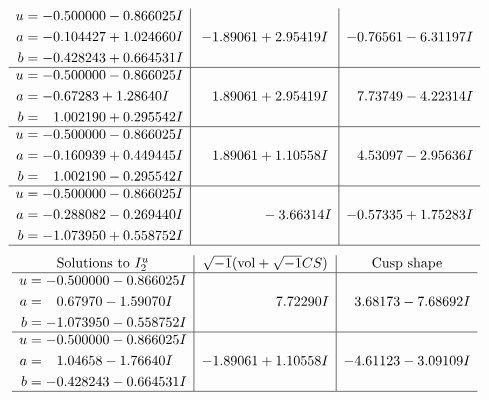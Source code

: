 \documentclass[1p]{elsarticle_modified}
\theoremstyle{definition}
\newcommand{\I}{\sqrt{-1}}
\begin{document}
$$\begin{array}{c|c|c}
\begin{aligned}
u &= -0.500000 - 0.866025 I \\
a &= -0.104427 + 1.024660 I \\
b &= -0.428243 + 0.664531 I\end{aligned}
 & -1.89061 + 2.95419 I & -0.76561 - 6.31197 I \\ \hline\begin{aligned}
u &= -0.500000 - 0.866025 I \\
a &= -0.67283 + 1.28640 I \\
b &= \phantom{-}1.002190 + 0.295542 I\end{aligned}
 & \phantom{-}1.89061 + 2.95419 I & \phantom{-}7.73749 - 4.22314 I \\ \hline\begin{aligned}
u &= -0.500000 - 0.866025 I \\
a &= -0.160939 + 0.449445 I \\
b &= \phantom{-}1.002190 - 0.295542 I\end{aligned}
 & \phantom{-}1.89061 + 1.10558 I & \phantom{-}4.53097 - 2.95636 I \\ \hline\begin{aligned}
u &= -0.500000 - 0.866025 I \\
a &= -0.288082 - 0.269440 I \\
b &= -1.073950 + 0.558752 I\end{aligned}
 & \phantom{-0.000000 } -3.66314 I & -0.57335 + 1.75283 I\\
 \hline 
 \end{array}$$\newpage$$\begin{array}{c|c|c}  
\text{Solutions to }I^u_{2}& \I (\text{vol} + \sqrt{-1}CS) & \text{Cusp shape}\\
 \hline 
\begin{aligned}
u &= -0.500000 - 0.866025 I \\
a &= \phantom{-}0.67970 - 1.59070 I \\
b &= -1.073950 - 0.558752 I\end{aligned}
 & \phantom{-0.000000 -}7.72290 I & \phantom{-}3.68173 - 7.68692 I \\ \hline\begin{aligned}
u &= -0.500000 - 0.866025 I \\
a &= \phantom{-}1.04658 - 1.76640 I \\
b &= -0.428243 - 0.664531 I\end{aligned}
 & -1.89061 + 1.10558 I & -4.61123 - 3.09109 I\\
 \hline 
 \end{array}$$\newpage\newpage\renewcommand{\arraystretch}{1}
\end{document}
